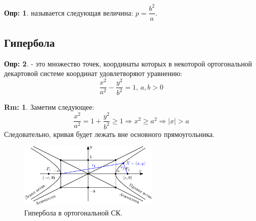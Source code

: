 \documentclass[12pt]{article}
\theoremstyle{definition}
\newtheorem{defn}{Опр:}
\newtheorem{rem}{Rm:}
\begin{document}
\begin{defn}
	 называется следующая величина: $p = \dfrac{b^2}{a}$.
\end{defn}

\subsection*{Гипербола}
\begin{defn}
	 - это множество точек, координаты которых в некоторой ортогональной декартовой системе координат удовлетворяют уравнению:
	$$
		\dfrac{x^2}{a^2} - \dfrac{y^2}{b^2} = 1, \, a,b > 0
	$$
\end{defn}
\begin{rem}
	Заметим следующее:
	$$
		\dfrac{x^2}{a^2} = 1 + \dfrac{y^2}{b^2} \geq 1 \Rightarrow x^2 \geq a^2 \Rightarrow |x| > a
	$$
	Следовательно, кривая будет лежать вне основного прямоугольника.
\end{rem}

\begin{figure}[H]
	\centering
	\includegraphics[width=0.6\textwidth]{ANGL3_2.eps}
	\caption{Гипербола в ортогональной СК.}
	\label{3_2}
\end{figure}
\end{document}
